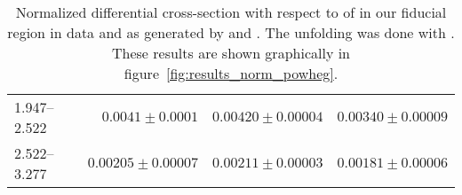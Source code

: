 \begin{table}
\begin{center}
\begin{tabular}{@{}l r r r@{}}
            1.947--2.522  &  $0.0041   \pm  0.0001$   &  $0.00420  \pm  0.00004$  &  $0.00340  \pm  0.00009$  \\
            2.522--3.277  &  $0.00205  \pm  0.00007$  &  $0.00211  \pm  0.00003$  &  $0.00181  \pm  0.00006$  \\
            \bottomrule
        \end{tabular}
    \end{center}
    \caption[
        Normalized differential cross-section with respect to \phistar of
        \Ztoee with \POWHEG unfolding.
    ]{
        Normalized differential cross-section with respect to \phistar of
        \Ztoee in our fiducial region in data and as generated by \MADGRAPH and
        \POWHEG. The unfolding was done with \POWHEG. These results are shown
        graphically in figure~\ref{fig:results_norm_powheg}.
    }
    \label{tab:results_norm_powheg}
\end{table}
